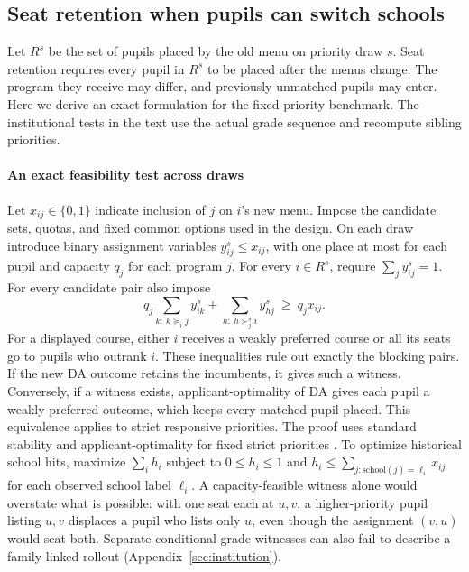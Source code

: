 \subsection{Seat retention when pupils can switch schools}\label{sec:seat-retention-theory}
Let $R^s$ be the set of pupils placed by the old menu on priority draw $s$.
Seat retention requires every pupil in $R^s$ to be placed after the menus change.
The program they receive may differ, and previously unmatched pupils may enter.
Here we derive an exact formulation for the fixed-priority benchmark. The
institutional tests in the text use the actual grade sequence and recompute
sibling priorities.

\paragraph{An exact feasibility test across draws}
Let $x_{ij}\in\{0,1\}$ indicate inclusion of $j$ on $i$'s new menu. Impose
the candidate sets, quotas, and fixed common options used in the design.
On each draw introduce binary assignment variables $y^s_{ij}\le x_{ij}$,
with one place at most for each pupil and capacity $q_j$ for each program $j$.
For every $i\in R^s$, require $\sum_j y^s_{ij}=1$. For every candidate pair
also impose
\[
q_j\sum_{k:\ k\succeq_i j} y^s_{ik}
 +\sum_{h:\ h\succ^s_j i} y^s_{hj}\ \ge\ q_j x_{ij}.
\]
For a displayed course, either $i$ receives a weakly preferred course or all
its seats go to pupils who outrank $i$. These inequalities rule out exactly
the blocking pairs. If the new DA outcome retains the incumbents, it gives
such a witness. Conversely, if a witness exists, applicant-optimality of DA
gives each pupil a weakly preferred outcome, which keeps every matched pupil
placed. This equivalence applies to strict responsive priorities.
The proof uses standard stability and applicant-optimality for fixed strict priorities \citep{gale1962,roth1986}. To optimize historical school hits, maximize $\sum_i h_i$ subject to
$0\le h_i\le 1$ and $h_i\le \sum_{j:\mathrm{school}(j)=\ell_i}x_{ij}$
for each observed school label $\ell_i$. A capacity-feasible witness alone
would overstate what is possible: with one seat each at $u,v$, a higher-priority
pupil listing $u,v$ displaces a pupil who lists only $u$, even though the
assignment $(v,u)$ would seat both. Separate conditional grade witnesses can
also fail to describe a family-linked rollout (Appendix~\ref{sec:institution}).

